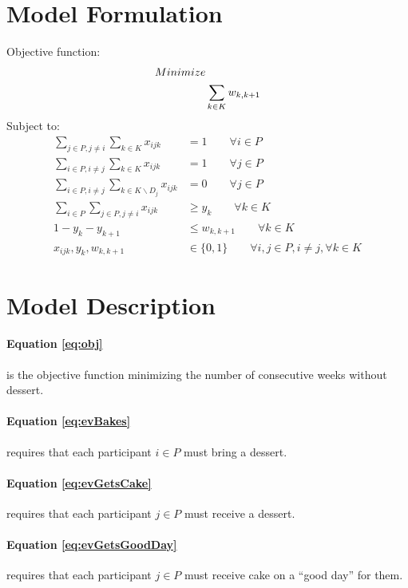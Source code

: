 \documentclass[11pt,letterpaper]{article}
\begin{document}
\section*{Model Formulation}
\noindent Objective function:
\begin{align}
Minimize & \notag \\
& \sum_{k \in K} w_{k,k+1}
\label{eq:obj}
\end{align}
Subject to:
\begin{align}
\sum_{j \in P, j \neq i} \sum_{k \in K} x_{ijk} &= 1 \qquad \forall i \in P
\label{eq:evBakes} \\
\sum_{i \in P, i \neq j} \sum_{k \in K} x_{ijk} &= 1 \qquad \forall j \in P
\label{eq:evGetsCake} \\
\sum_{i \in P, i \neq j} \sum_{k \in K \backslash D_j} x_{ijk} &= 0 \qquad \forall j \in P
\label{eq:evGetsGoodDay} \\
\sum_{i \in P} \sum_{j \in P, j \neq i} x_{ijk} &\ge y_k \qquad \forall k \in K
\label{eq:yTrig} \\
1 - y_k - y_{k+1} & \le w_{k,k+1} \qquad \forall k \in K
\label{eq:wTrig} \\
x_{ijk}, y_k, w_{k,k+1} &\in \{0,1\} \qquad \forall i,j \in P, i \neq j, \forall k \in K
\label{eq:binary}
\end{align}

\section*{Model Description}
\paragraph{Equation \eqref{eq:obj}} is the objective function minimizing the number of consecutive weeks without dessert.

\paragraph{Equation \eqref{eq:evBakes}} requires that each participant $i \in P$ must bring a dessert.

\paragraph{Equation \eqref{eq:evGetsCake}} requires that each participant $j \in P$ must receive a dessert.

\paragraph{Equation \eqref{eq:evGetsGoodDay}} requires that each participant $j \in P$ must receive cake on a ``good day'' for them.
\end{document}
